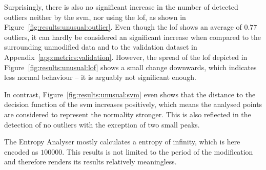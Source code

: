 Surprisingly, there is also no significant increase in the number of detected outliers neither by the \gls{svm}, nor using the \gls{lof}, as shown in Figure~\ref{fig:results:unusual:outlier}.
Even though the \gls{lof} shows an average of $0.77$ outliers, it can hardly be considered an significant increase when compared to the surrounding unmodified data and to the validation dataset in Appendix~\ref{app:metrics:validation}.
However, the spread of the \gls{lof} depicted in Figure~\ref{fig:results:unusual:lof} shows a small change downwards, which indicates less normal behaviour -- it is arguably not significant enough.

In contrast, Figure~\ref{fig:results:unusual:svm} even shows that the distance to the decision function of the \gls{svm} increases positively, which means the analysed points are considered to represent the normality stronger. This is also reflected in the detection of no outliers with the exception of two small peaks.

The Entropy Analyser mostly calculates a entropy of infinity, which is here encoded as $100000$. This results is not limited to the period of the modification and therefore renders its results relatively meaningless.

